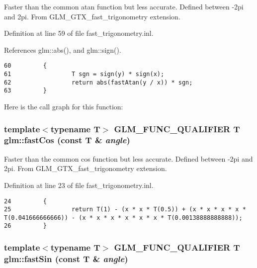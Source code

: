 Faster than the common atan function but less accurate. Defined between -2pi and 2pi. From GLM\_\-GTX\_\-fast\_\-trigonometry extension. 

Definition at line 59 of file fast\_\-trigonometry.inl.

References glm::abs(), and glm::sign().

\begin{Code}\begin{verbatim}60         {
61                 T sgn = sign(y) * sign(x);
62                 return abs(fastAtan(y / x)) * sgn;
63         }
\end{verbatim}
\end{Code}




Here is the call graph for this function:\hypertarget{group__gtx__fast__trigonometry_g40743124db6dc2a59de72aa81bc1cf93}{
\subsubsection[fastCos]{\setlength{\rightskip}{0pt plus 5cm}template$<$typename T$>$ GLM\_\-FUNC\_\-QUALIFIER T glm::fastCos (const T \& {\em angle})}}
\label{group__gtx__fast__trigonometry_g40743124db6dc2a59de72aa81bc1cf93}


Faster than the common cos function but less accurate. Defined between -2pi and 2pi. From GLM\_\-GTX\_\-fast\_\-trigonometry extension. 

Definition at line 23 of file fast\_\-trigonometry.inl.

\begin{Code}\begin{verbatim}24         {
25                 return T(1) - (x * x * T(0.5)) + (x * x * x * x * T(0.041666666666)) - (x * x * x * x * x * x * T(0.00138888888888));
26         }
\end{verbatim}
\end{Code}


\hypertarget{group__gtx__fast__trigonometry_g2f7a014f1fb9b16ede8b0cac0beba9f1}{
\subsubsection[fastSin]{\setlength{\rightskip}{0pt plus 5cm}template$<$typename T$>$ GLM\_\-FUNC\_\-QUALIFIER T glm::fastSin (const T \& {\em angle})}}
\label{group__gtx__fast__trigonometry_g2f7a014f1fb9b16ede8b0cac0beba9f1}


